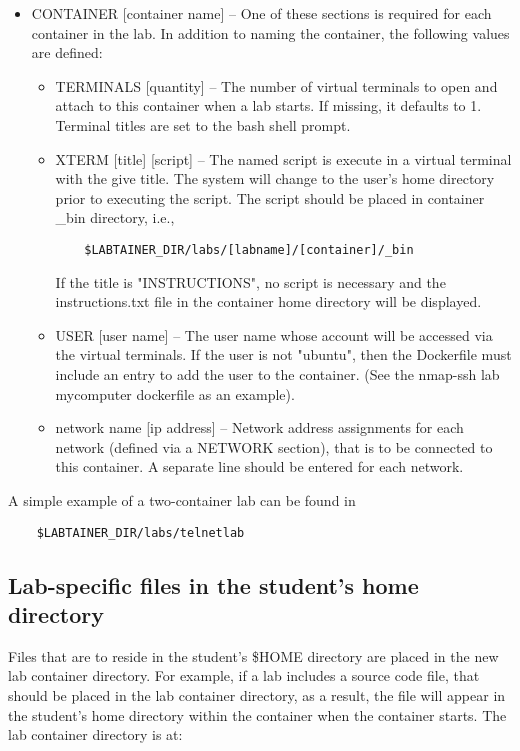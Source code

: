 \documentclass[12pt]{article}
\begin{document}
\begin{itemize}
\item CONTAINER [container name] -- One of these sections is required for each container in the lab.
In addition to naming the container, the following values are defined: 

\begin{itemize}
\item TERMINALS [quantity] -- The number of virtual terminals to open and attach to this 
container when a lab starts.  If missing, it defaults to 1. Terminal titles are set to the 
bash shell prompt.
\item XTERM [title] [script] -- The named script is execute in a virtual terminal with the
give title.   The system will change to the user's home directory prior to executing the
script.  The script should be placed in container \_bin directory, i.e.,
\begin{verbatim}
    $LABTAINER_DIR/labs/[labname]/[container]/_bin
\end{verbatim}
\noindent If the title is "INSTRUCTIONS", no script is necessary and the instructions.txt file
in the container home directory will be displayed.
\item USER [user name] -- The user name whose account will be accessed via the virtual terminals. If
the user is not "ubuntu", then the Dockerfile must include an entry to add the user to the container.
(See the nmap-ssh lab mycomputer dockerfile as an example).
\item network name [ip address] -- Network address assignments for each network (defined via a NETWORK section), 
that is to be connected to this container.  A separate line should be entered for each network.
\end{itemize}
\end{itemize}
  
A simple example of a two-container lab can be found in 
\begin{verbatim}
    $LABTAINER_DIR/labs/telnetlab
\end{verbatim}


\subsection {Lab-specific files in the student's home directory}
Files that are to reside in the student's \$HOME directory are placed in the 
new lab container directory.  For example, if a lab includes a source code file, that
should be placed in the lab container directory, as a result, the file will appear in the student's
home directory within the container when the container starts.  The lab container
directory is at:  
\end{document}
